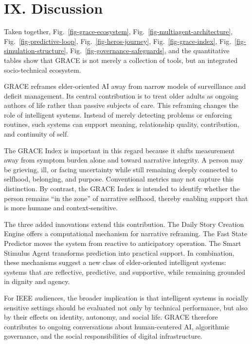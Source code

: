 \documentclass[
  journal,
]{IEEEtran}%
\begin{document}
\section{IX. Discussion}\label{ix.-discussion}

Taken together, Fig.~\ref{fig-grace-ecosystem},
Fig.~\ref{fig-multiagent-architecture}, Fig.~\ref{fig-predictive-loop},
Fig.~\ref{fig-heros-journey}, Fig.~\ref{fig-grace-index},
Fig.~\ref{fig-simulation-structure},
Fig.~\ref{fig-governance-safeguards}, and the quantitative tables show
that GRACE is not merely a collection of tools, but an integrated
socio-technical ecosystem.

GRACE reframes elder-oriented AI away from narrow models of surveillance
and deficit management. Its central contribution is to treat older
adults as ongoing authors of life rather than passive subjects of care.
This reframing changes the role of intelligent systems. Instead of
merely detecting problems or enforcing routines, such systems can
support meaning, relationship quality, contribution, and continuity of
self.

The GRACE Index is important in this regard because it shifts
measurement away from symptom burden alone and toward narrative
integrity. A person may be grieving, ill, or facing uncertainty while
still remaining deeply connected to selfhood, belonging, and purpose.
Conventional metrics may not capture this distinction. By contrast, the
GRACE Index is intended to identify whether the person remains ``in the
zone'' of narrative selfhood, thereby enabling support that is more
humane and context-sensitive.

The three added innovations extend this contribution. The Daily Story
Creation Engine offers a computational mechanism for narrative
reframing. The Fast State Predictor moves the system from reactive to
anticipatory operation. The Smart Stimulus Agent transforms prediction
into practical support. In combination, these mechanisms suggest a new
class of elder-oriented intelligent systems: systems that are
reflective, predictive, and supportive, while remaining grounded in
dignity and agency.

For IEEE audiences, the broader implication is that intelligent systems
in socially sensitive settings should be evaluated not only by technical
performance, but also by their effects on identity, autonomy, and social
life. GRACE therefore contributes to ongoing conversations about
human-centered AI, algorithmic governance, and the social
responsibilities of digital infrastructure.
\end{document}
